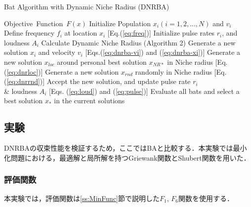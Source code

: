 \documentclass[a4j,11pt]{jarticle}
\begin{document}
\begin{algorithm}[h]
\caption{Bat Algorithm with Dynamic Niche Radius (DNRBA)}
\label{code:dnrba}
\begin{algorithmic}[3]
\REQUIRE Objective\ Function\ $F(x)$
\STATE Initialize Population $x_i(i=1,2,..., N)$ and $v_i$\\
\STATE Define frequency $f_i$ at location $x_i$ [Eq.(\ref{eq:freq})]
\STATE Initialize pulse rates $r_i$, and loudness $A_i$
\STATE Calculate Dynamic Niche Radius (Algorithm 2)
\STATE Generate a new solution $x_i$ and velocity $v_i$ [Eqs.(\ref{eq:dnrba-vi}) and (\ref{eq:dnrba-xi})]
\ENDIF
{}
\STATE Generate a new solution $x_{loc}$ around personal best solution $x_{NR*}$ in Niche radius [Eq.(\ref{eq:dnrloc})] 
\ENDIF
\STATE Generate a new solution $x_{rnd}$ randomly in Niche radius [Eq.(\ref{eq:dnrrnd})]
\STATE Accept the new solution, and update pulse rate $r_i$ \\ \& loudness $A_i$ [Eqs. (\ref{eq:loud}) and (\ref{eq:pulse})]  
\ENDIF
\STATE Evaluate all bats and select a best solution $x_*$ in the current solutions
\ENDFOR
\ENDWHILE
\end{algorithmic}
\end{algorithm}

\subsection{実験}
\label{ss:DNRBA-exp}
DNRBAの収束性能を検証するため，ここではBAと比較する．本実験では最小化問題における，最適解と局所解を持つGriewank関数とShubert関数を用いた．

\subsubsection{評価関数}
\label{sss:DNRBA-func}
本実験では，評価関数は\ref{ss:MinFunc}節で説明した$F_1$, $F_6$関数を使用する．

\end{document}
